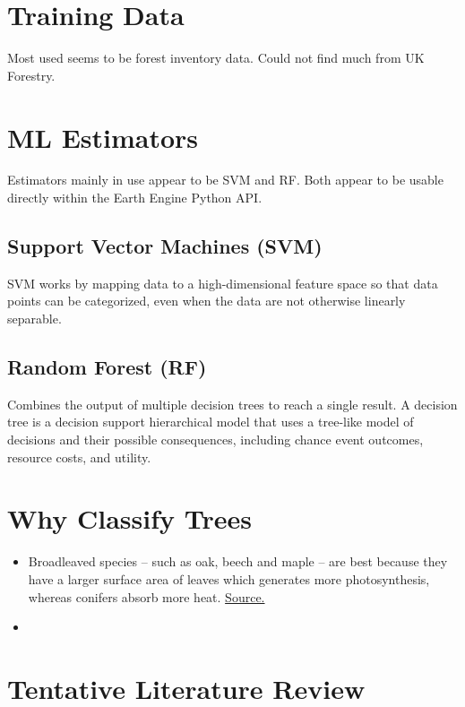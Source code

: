\section{Training Data}

Most used seems to be forest inventory data.
Could not find much from UK Forestry.

\section{ML Estimators}

Estimators mainly in use appear to be SVM and RF. Both appear to be usable directly within the Earth Engine Python API. 

\subsection{Support Vector Machines (SVM)}

SVM works by mapping data to a high-dimensional feature space so that data points 
can be categorized, even when the data are not otherwise linearly separable.

\subsection{Random Forest (RF)}

Combines the output of multiple decision trees to reach a single result. A decision tree is a decision support hierarchical model that uses a tree-like model of decisions and their possible consequences, including chance event outcomes, resource costs, and utility.


\section{Why Classify Trees}

\begin{itemize}
    \item Broadleaved species – such as oak, beech and maple – are best because they have a larger surface area of leaves which generates more photosynthesis, whereas conifers absorb more heat. \hyperlink{https://www.glendale-services.co.uk/latest-news/plant-the-right-trees-to-combat-climate-change/}{Source.}
    \item 
\end{itemize}

\section{Tentative Literature Review}


